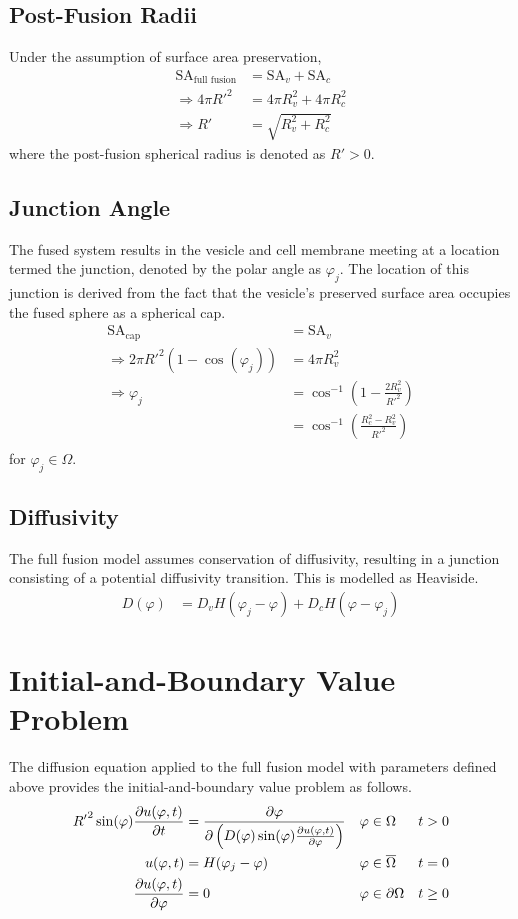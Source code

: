 \documentclass{report}
\newcommand\Par[1]{{ \left({#1}\right) }}
\newcommand\R{{ R' }}
\newcommand\SA{{ \text{SA} }}
\begin{document}
\subsection{Post-Fusion Radii}
Under the assumption of surface area preservation,
\begin{align*}
	\SA_\text{full fusion} &= \SA_v + \SA_c \\
	\Rightarrow 4\pi \R^2 &= 4\pi R_v^2 + 4\pi R_c^2 \\
	\Rightarrow \R &= \sqrt{R_v^2 + R_c^2}
\end{align*}
where the post-fusion spherical radius is denoted as $\R > 0$.

\subsection{Junction Angle}
The fused system results in the vesicle and cell membrane meeting at a location termed the junction, denoted by the polar angle as $\varphi_j$. The location of this junction is derived from the fact that the vesicle's preserved surface area occupies the fused sphere as a spherical cap.
\begin{align*}
	\SA_\text{cap} &= \SA_v \\
	\Rightarrow 2\pi \R^2 \Par{1 - \cos(\varphi_j)} &= 4\pi R_v^2 \\
	\Rightarrow \varphi_j &= \cos^{-1}\Par{1 - \frac{2R_v^2}{\R^2}} \\
	&= \cos^{-1}\Par{\frac{R_c^2 - R_v^2}{\R^2}} \\
\end{align*}
for $\varphi_j \in \Omega$.

\subsection{Diffusivity}
The full fusion model assumes conservation of diffusivity, resulting in a junction consisting of a potential diffusivity transition. This is modelled as Heaviside.
\begin{align*}
	D(\varphi) &= D_v H(\varphi_j - \varphi) + D_c H(\varphi - \varphi_j)
\end{align*}

\section{Initial-and-Boundary Value Problem}
The diffusion equation applied to the full fusion model with parameters defined above provides the initial-and-boundary value problem as follows.
\begin{align*}
	\R^2 \sin(\varphi) \pdv{u(\varphi, t)}{t} &= \pdv\varphi\Par{D(\varphi) \sin(\varphi) \pdv{u(\varphi, t)}{\varphi}}
	& \varphi &\in \Omega
	& t &> 0 \\
	u(\varphi, t) &= H(\varphi_j - \varphi)
	& \varphi &\in \overline\Omega
	& t &= 0 \\
	\pdv{u(\varphi, t)}{\varphi} &= 0 & \varphi &\in \partial\Omega & t &\geq 0
\end{align*}
\end{document}
